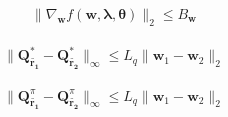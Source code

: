 \begin{lemma}
    \label{lemma:f_lipschitz_wrt_rew_params}
    \begin{align*}
        \|\nabla_{\bm{w}} f(\bm{w},\bm{\lambda},\bm{\theta})\|_2 \leq B_{\bm{w}}
    \end{align*}
\end{lemma}

\begin{lemma}
    \label{lemma:optQ_is_lipschitz_wrt_w}
    \begin{align*}
        \| \bm{Q}^{*}_{\tilde{\bm{r_1}}} - \bm{Q}^{*}_{\tilde{\bm{r_2}}} \|_\infty  
        \leq L_q \| \bm{w}_1 - \bm{w}_2 \|_2
    \end{align*}
\end{lemma}

\begin{lemma}
    \label{lemma:sameQ_is_lipschitz_wrt_w}
    \begin{align*}
        \| \bm{Q}^{\pi}_{\tilde{\bm{r_1}}} - \bm{Q}^{\pi}_{\tilde{\bm{r_2}}} \|_\infty  
        \leq L_q \| \bm{w}_1 - \bm{w}_2 \|_2
    \end{align*}
\end{lemma}

\begin{lemma}
    \label{lemma:ftilde_is_convex}
\end{lemma}